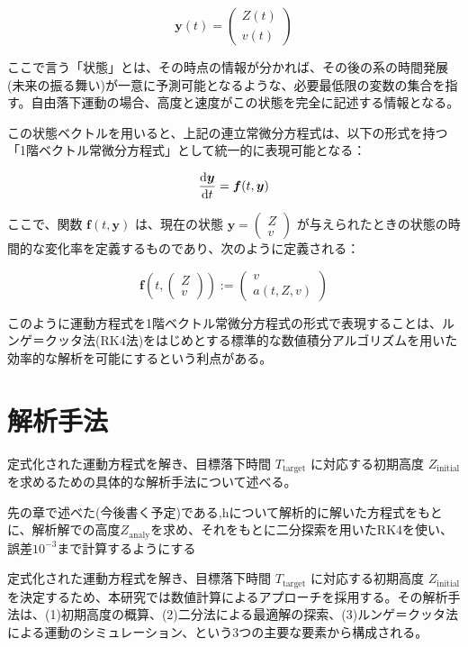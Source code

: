 \documentclass[a4paper,12pt]{article}
\begin{document}
\[
\bm{y}(t) = \begin{pmatrix} Z(t) \\ v(t) \end{pmatrix}
\]

ここで言う「状態」とは、その時点の情報が分かれば、その後の系の時間発展(未来の振る舞い)が一意に予測可能となるような、必要最低限の変数の集合を指す。自由落下運動の場合、高度と速度がこの状態を完全に記述する情報となる。

この状態ベクトルを用いると、上記の連立常微分方程式は、以下の形式を持つ「1階ベクトル常微分方程式」として統一的に表現可能となる：

\[
\dv{\bm{y}}{t} = \bm{f}(t, \bm{y})
\]

ここで、関数 $\bm{f}(t, \bm{y})$ は、現在の状態 $\bm{y} = \begin{pmatrix} Z \\ v \end{pmatrix}$ が与えられたときの状態の時間的な変化率を定義するものであり、次のように定義される：

\[
\bm{f}\left(t, \begin{pmatrix} Z \\ v \end{pmatrix}\right) := \begin{pmatrix} v \\ a(t, Z, v) \end{pmatrix}
\]

このように運動方程式を1階ベクトル常微分方程式の形式で表現することは、ルンゲ＝クッタ法(RK4法)をはじめとする標準的な数値積分アルゴリズムを用いた効率的な解析を可能にするという利点がある。

\section{解析手法}


定式化された運動方程式を解き、目標落下時間 $T_{\mathrm{target}}$ に対応する初期高度 $Z_{\mathrm{initial}}$ を求めるための具体的な解析手法について述べる。

先の章で述べた(今後書く予定)である,hについて解析的に解いた方程式をもとに、解析解での高度$Z_{\mathrm{analy}}$を求め、それをもとに二分探索を用いたRK4を使い、誤差$10^{-3}$まで計算するようにする

\label{sec:method}

定式化された運動方程式を解き、目標落下時間 $T_{\mathrm{target}}$ に対応する初期高度 $Z_{\mathrm{initial}}$ を決定するため、本研究では数値計算によるアプローチを採用する。その解析手法は、(1)初期高度の概算、(2)二分法による最適解の探索、(3)ルンゲ＝クッタ法による運動のシミュレーション、という3つの主要な要素から構成される。
\end{document}
